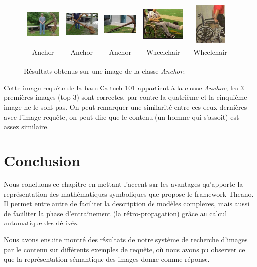\begin{figure}[H]
\begin{tabular}{ccccc}
\includegraphics[width=3cm]{Figures/anchor/1.jpg}
&
\includegraphics[width=3cm]{Figures/anchor/2.jpg}
&
\includegraphics[width=3cm]{Figures/anchor/3.jpg}
&
\includegraphics[width=3cm]{Figures/anchor/4.jpg}
&
\includegraphics[height=2cm,width=3cm]{Figures/anchor/5.jpg}\\
Anchor & Anchor & Anchor & Wheelchair & Wheelchair\\

\end{tabular}
\caption[comp7]{Résultats obtenus sur une image de la classe \textit{Anchor}.}
\end{figure}

	Cette image requête de la base Caltech-101 appartient à la classe \textit{Anchor}, les 3 premières images (top-3) sont correctes, par contre la quatrième et la cinquième image ne le sont pas. On peut remarquer une similarité entre ces deux dernières avec l'image requête, on peut dire que le contenu (un homme qui s'assoit) est assez similaire.

\section{Conclusion}

	Nous concluons ce chapitre en mettant l'accent sur les avantages qu'apporte la représentation des mathématiques symboliques que propose le framework Theano. Il permet entre autre de faciliter la description de modèles complexes, mais aussi de faciliter la phase d'entraînement (la rétro-propagation) grâce au calcul automatique des dérivés.
	
	Nous avons ensuite montré des résultats de notre système de recherche d'images par le contenu sur différents exemples de requête, où nous avons pu observer ce que la représentation sémantique des images donne comme réponse.
	
	